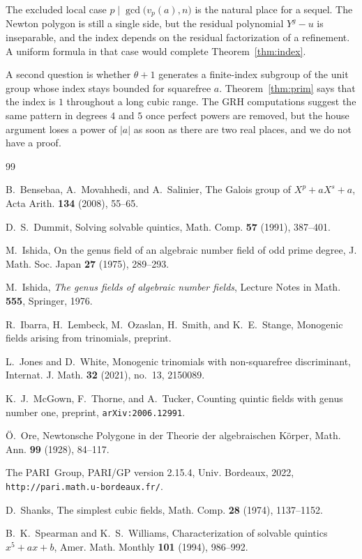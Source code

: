 \documentclass[11pt]{article}
\theoremstyle{definition}
\theoremstyle{remark}
\begin{document}
The excluded local case $p\mid\gcd\bigl(v_p(a),n\bigr)$ is the natural place for
a sequel. The Newton polygon is still a single side, but the residual polynomial
$Y^{g}-u$ is inseparable, and the index depends on the residual factorization of
a refinement. A uniform formula in that case would complete
Theorem~\ref{thm:index}.

A second question is whether $\theta+1$ generates a finite-index subgroup of the
unit group whose index stays bounded for squarefree $a$.
Theorem~\ref{thm:prim} says that the index is $1$ throughout a long cubic range.
The GRH computations suggest the same pattern in degrees $4$ and $5$ once perfect
powers are removed, but the house argument loses a power of $|a|$ as soon as
there are two real places, and we do not have a proof.

\begin{thebibliography}{99}

B.~Bensebaa, A.~Movahhedi, and A.~Salinier,
The {G}alois group of {$X^{p}+aX^{s}+a$},
Acta Arith. \textbf{134} (2008), 55--65.

D.~S.~Dummit,
Solving solvable quintics,
Math. Comp. \textbf{57} (1991), 387--401.

M.~Ishida,
On the genus field of an algebraic number field of odd prime degree,
J. Math. Soc. Japan \textbf{27} (1975), 289--293.

M.~Ishida,
\emph{The genus fields of algebraic number fields},
Lecture Notes in Math. \textbf{555}, Springer, 1976.

R.~Ibarra, H.~Lembeck, M.~Ozaslan, H.~Smith, and K.~E.~Stange,
Monogenic fields arising from trinomials,
preprint.

L.~Jones and D.~White,
Monogenic trinomials with non-squarefree discriminant,
Internat. J. Math. \textbf{32} (2021), no.~13, 2150089.

K.~J.~McGown, F.~Thorne, and A.~Tucker,
Counting quintic fields with genus number one,
preprint, \texttt{arXiv:2006.12991}.

{\"O}.~Ore,
{N}ewtonsche {P}olygone in der {T}heorie der algebraischen {K}\"orper,
Math. Ann. \textbf{99} (1928), 84--117.

The {PARI}~Group,
{PARI/GP} version 2.15.4, Univ. Bordeaux, 2022,
\texttt{http://pari.math.u-bordeaux.fr/}.

D.~Shanks,
The simplest cubic fields,
Math. Comp. \textbf{28} (1974), 1137--1152.

B.~K.~Spearman and K.~S.~Williams,
Characterization of solvable quintics {$x^{5}+ax+b$},
Amer. Math. Monthly \textbf{101} (1994), 986--992.

\end{thebibliography}
\end{document}
